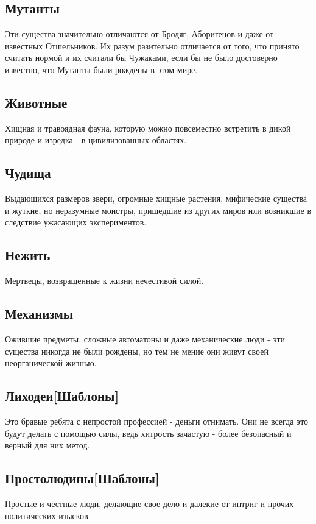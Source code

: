\subsection{Мутанты}
Эти существа значительно отличаются от Бродяг, Аборигенов и даже от известных Отшельников. Их разум разительно отличается от того, что принято считать нормой и их считали бы Чужаками, если бы не было достоверно известно, что Мутанты были рождены в этом мире.

\subsection{Животные}
Хищная и травоядная фауна, которую можно повсеместно встретить в дикой природе и изредка - в цивилизованных областях.

\subsection{Чудища}
Выдающихся размеров звери, огромные хищные растения, мифические существа и жуткие, но неразумные монстры, пришедшие из других миров или возникшие в следствие ужасающих экспериментов.

\subsection{Нежить}
Мертвецы, возвращенные к жизни нечестивой силой.

\subsection{Механизмы}
Ожившие предметы, сложные автоматоны и даже механические люди - эти существа никогда не были рождены, но тем не мение они живут своей неорганической жизнью.

\subsection{Лиходеи[Шаблоны]}
Это бравые ребята с непростой профессией - деньги отнимать. Они не всегда это будут делать с помощью силы, ведь хитрость зачастую - более безопасный и верный для них метод.

\subsection{Простолюдины[Шаблоны]}
Простые и честные люди, делающие свое дело и далекие от интриг и прочих политических изысков

